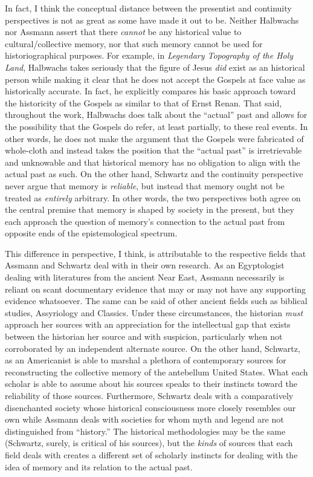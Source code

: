 In fact, I think the conceptual distance between the presentist and
continuity perspectives is not as great as some have made it out to be.
Neither Halbwachs nor Assmann assert that there \emph{cannot} be any
historical value to cultural/collective memory, nor that such memory
cannot be used for historiographical purposes. For example, in
\emph{Legendary Topography of the Holy Land}, Halbwachs takes seriously
that the figure of Jesus \emph{did} exist as an historical person while
making it clear that he does not accept the Gospels at face value as
historically accurate. In fact, he explicitly compares his basic
approach toward the historicity of the Gospels as similar to that of
Ernst Renan. That said, throughout the work, Halbwachs does talk about
the ``actual'' past and allows for the possibility that the Gospels do
refer, at least partially, to these real events. In other words, he does
not make the argument that the Gospels were fabricated of whole-cloth
and instead takes the position that the ``actual past'' is irretrievable
and unknowable and that historical memory has no obligation to align
with the actual past as such. On the other hand, Schwartz and the
continuity perspective never argue that memory is \emph{reliable}, but
instead that memory ought not be treated as \emph{entirely} arbitrary.
In other words, the two perspectives both agree on the central premise
that memory is shaped by society in the present, but they each approach
the question of memory's connection to the actual past from opposite
ends of the epistemological spectrum.

This difference in perspective, I think, is attributable to the
respective fields that Assmann and Schwartz deal with in their own
research. As an Egyptologist dealing with literatures from the ancient
Near East, Assmann necessarily is reliant on scant documentary evidence
that may or may not have any supporting evidence whatsoever. The same
can be said of other ancient fields such as biblical studies,
Assyriology and Classics. Under these circumstances, the historian
\emph{must} approach her sources with an appreciation for the
intellectual gap that exists between the historian her source and with
suspicion, particularly when not corroborated by an independent
alternate source. On the other hand, Schwartz, as an Americanist is able
to marshal a plethora of contemporary sources for reconstructing the
collective memory of the antebellum United States. What each scholar is
able to assume about his sources speaks to their instincts toward the
reliability of those sources. Furthermore, Schwartz deals with a
comparatively disenchanted society whose historical consciousness more
closely resembles our own while Assmann deals with societies for whom
myth and legend are not distinguished from ``history.'' The historical
methodologies may be the same (Schwartz, surely, is critical of his
sources), but the \emph{kinds} of sources that each field deals with
creates a different set of scholarly instincts for dealing with the idea
of memory and its relation to the actual past.

